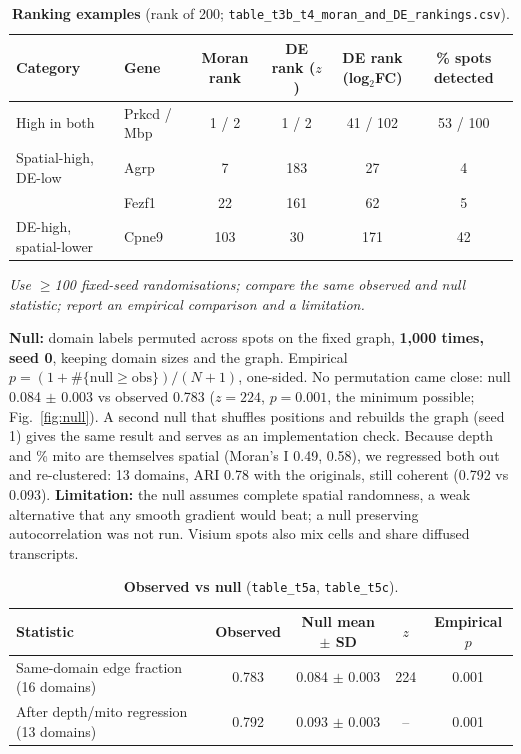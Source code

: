 \documentclass{cisXXX} %
\newcommand{\code}[1]{\texttt{\small #1}}
\newcommand{\q}[1]{\textit{#1}\par\smallskip\noindent}
\begin{document}
\begin{table}[H]
\centering\footnotesize
\caption{\textbf{Ranking examples} (rank of 200; \code{table\_t3b\_t4\_moran\_and\_DE\_rankings.csv}).}
\label{tab:t4}
\begin{tabular}{@{}l l c c c c@{}}
\toprule
Category & Gene & Moran rank & DE rank ($z$) & DE rank (log$_2$FC) & \% spots detected \\
\midrule
High in both & Prkcd / Mbp & 1 / 2 & 1 / 2 & 41 / 102 & 53 / 100 \\
Spatial-high, DE-low & Agrp & 7 & 183 & 27 & 4 \\
 & Fezf1 & 22 & 161 & 62 & 5 \\
DE-high, spatial-lower & Cpne9 & 103 & 30 & 171 & 42 \\
\bottomrule
\end{tabular}
\end{table}

\label{t5}
\q{Use $\ge$100 fixed-seed randomisations; compare the same observed and null statistic; report an empirical comparison and a limitation.}
\textbf{Null:} domain labels permuted across spots on the fixed graph, \textbf{1{,}000 times, seed 0}, keeping domain sizes and the graph. Empirical $p = (1+\#\{\text{null}\ge\text{obs}\})/(N+1)$, one-sided. No permutation came close: null 0.084 $\pm$ 0.003 vs observed 0.783 ($z=224$, $p=0.001$, the minimum possible; Fig.~\ref{fig:null}). A second null that shuffles positions and rebuilds the graph (seed 1) gives the same result and serves as an implementation check. Because depth and \% mito are themselves spatial (Moran's I 0.49, 0.58), we regressed both out and re-clustered: 13 domains, ARI 0.78 with the originals, still coherent (0.792 vs 0.093). \textbf{Limitation:} the null assumes complete spatial randomness, a weak alternative that any smooth gradient would beat; a null preserving autocorrelation was not run. Visium spots also mix cells and share diffused transcripts.

\begin{table}[H]
\centering\small
\caption{\textbf{Observed vs null} (\code{table\_t5a}, \code{table\_t5c}).}
\label{tab:sp}
\begin{tabular}{@{}l c c c c@{}}
\toprule
Statistic & Observed & Null mean $\pm$ SD & $z$ & Empirical $p$ \\
\midrule
Same-domain edge fraction (16 domains) & 0.783 & 0.084 $\pm$ 0.003 & 224 & 0.001 \\
After depth/mito regression (13 domains) & 0.792 & 0.093 $\pm$ 0.003 & -- & 0.001 \\
\bottomrule
\end{tabular}
\end{table}
\end{document}
